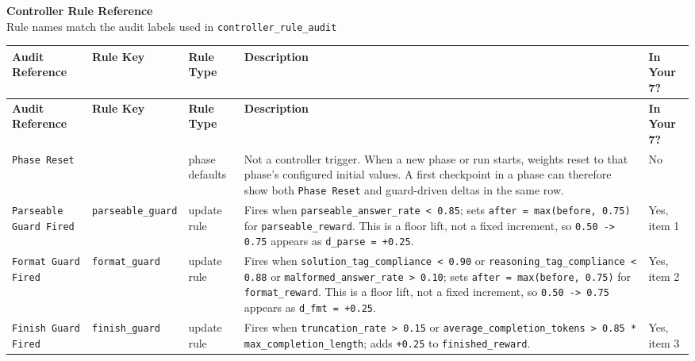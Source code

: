 \documentclass[11pt]{article}
\newcommand{\rulekey}[1]{\nolinkurl{#1}}
\begin{document}
\begin{center}
{\LARGE \textbf{Controller Rule Reference}}\\[0.5em]
{\large Rule names match the audit labels used in \texttt{controller\_rule\_audit}}\\[1em]
\end{center}

\renewcommand{\arraystretch}{1.18}
\setlength{\tabcolsep}{3pt}
\footnotesize
\begin{longtable}{L{0.17\textwidth} L{0.18\textwidth} L{0.11\textwidth} L{0.30\textwidth} L{0.14\textwidth}}
\toprule
\textbf{Audit Reference} &
\textbf{Rule Key} &
\textbf{Rule Type} &
\textbf{Description} &
\textbf{In Your 7?} \\
\midrule
\endfirsthead

\toprule
\textbf{Audit Reference} &
\textbf{Rule Key} &
\textbf{Rule Type} &
\textbf{Description} &
\textbf{In Your 7?} \\
\midrule
\endhead

\texttt{Phase Reset} &
 &
phase defaults &
Not a controller trigger. When a new phase or run starts, weights reset to that phase's configured initial values. A first checkpoint in a phase can therefore show both \texttt{Phase Reset} and guard-driven deltas in the same row. &
No \\

\texttt{Parseable Guard Fired} &
\rulekey{parseable_guard} &
update rule &
Fires when \texttt{parseable\_answer\_rate < 0.85}; sets \texttt{after = max(before, 0.75)} for \texttt{parseable\_reward}. This is a floor lift, not a fixed increment, so \texttt{0.50 -> 0.75} appears as \texttt{d\_parse = +0.25}. &
Yes, item 1 \\

\texttt{Format Guard Fired} &
\rulekey{format_guard} &
update rule &
Fires when \texttt{solution\_tag\_compliance < 0.90} or \texttt{reasoning\_tag\_compliance < 0.88} or \texttt{malformed\_answer\_rate > 0.10}; sets \texttt{after = max(before, 0.75)} for \texttt{format\_reward}. This is a floor lift, not a fixed increment, so \texttt{0.50 -> 0.75} appears as \texttt{d\_fmt = +0.25}. &
Yes, item 2 \\

\texttt{Finish Guard Fired} &
\rulekey{finish_guard} &
update rule &
Fires when \texttt{truncation\_rate > 0.15} or \texttt{average\_completion\_tokens > 0.85 * max\_completion\_length}; adds \texttt{+0.25} to \texttt{finished\_reward}. &
Yes, item 3 \\


\end{longtable}
\end{document}
